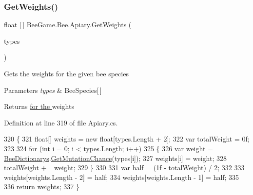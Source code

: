 \subsubsection{\texorpdfstring{Get\+Weights()}{GetWeights()}}
{\footnotesize\ttfamily float \mbox{[}$\,$\mbox{]} Bee\+Game.\+Bee.\+Apiary.\+Get\+Weights (\begin{DoxyParamCaption}\item[{\hyperlink{namespace_bee_game_1_1_enums_aa2ead984825678d83c42d48f6382619c}{Bee\+Species} \mbox{[}$\,$\mbox{]}}]{types }\end{DoxyParamCaption})\hspace{0.3cm}{\ttfamily [private]}}



Gets the weights for the given bee species 


\begin{DoxyParams}{Parameters}
{\em types} & Bee\+Species\mbox{[}$\,$\mbox{]}\\
\hline
\end{DoxyParams}
\begin{DoxyReturn}{Returns}
\hyperlink{}{for the } weights
\end{DoxyReturn}


Definition at line 319 of file Apiary.\+cs.


\begin{DoxyCode}
320         \{
321             \textcolor{keywordtype}{float}[] weights = \textcolor{keyword}{new} \textcolor{keywordtype}{float}[types.Length + 2];
322             var totalWeight = 0f;
323 
324             \textcolor{keywordflow}{for} (\textcolor{keywordtype}{int} i = 0; i < types.Length; i++)
325             \{
326                 var weight = \hyperlink{class_bee_game_1_1_core_1_1_bee_dictionarys}{BeeDictionarys}.\hyperlink{class_bee_game_1_1_core_1_1_bee_dictionarys_adb5fe5760a94dbff606bc1d20ee67aaa}{GetMutationChance}(types[i]);
327                 weights[i] = weight;
328                 totalWeight += weight;
329             \}
330 
331             var half = (1f - totalWeight) / 2;
332 
333             weights[weights.Length - 2] = half;
334             weights[weights.Length - 1] = half;
335 
336             \textcolor{keywordflow}{return} weights;
337         \}
\end{DoxyCode}
\mbox{\label{class_bee_game_1_1_bee_1_1_apiary_a066f8a76bdd01acbaed48e25768f36e4}} 

